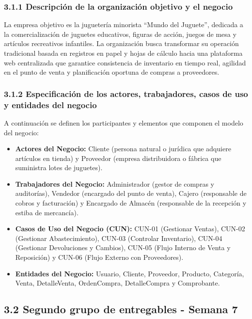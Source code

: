 \documentclass[12pt,a4paper]{article}
\begin{document}
\subsubsection{3.1.1 Descripci\'on de la organizaci\'on objetivo y el negocio}

La empresa objetivo es la jugueter\'ia minorista ``Mundo del Juguete'', dedicada a la comercializaci\'on de juguetes educativos, figuras de acci\'on, juegos de mesa y art\'iculos recreativos infantiles. La organizaci\'on busca transformar su operaci\'on tradicional basada en registros en papel y hojas de c\'alculo hacia una plataforma web centralizada que garantice consistencia de inventario en tiempo real, agilidad en el punto de venta y planificaci\'on oportuna de compras a proveedores.

\subsubsection{3.1.2 Especificaci\'on de los actores, trabajadores, casos de uso y entidades del negocio}

A continuaci\'on se definen los participantes y elementos que componen el modelo del negocio:
\begin{itemize}
  \item \textbf{Actores del Negocio:} Cliente (persona natural o jur\'idica que adquiere art\'iculos en tienda) y Proveedor (empresa distribuidora o f\'abrica que suministra lotes de juguetes).
  \item \textbf{Trabajadores del Negocio:} Administrador (gestor de compras y auditor\'ias), Vendedor (encargado del punto de venta), Cajero (responsable de cobros y facturaci\'on) y Encargado de Almac\'en (responsable de la recepci\'on y estiba de mercanc\'ia).
  \item \textbf{Casos de Uso del Negocio (CUN):} CUN-01 (Gestionar Ventas), CUN-02 (Gestionar Abastecimiento), CUN-03 (Controlar Inventario), CUN-04 (Gestionar Devoluciones y Cambios), CUN-05 (Flujo Interno de Venta y Reposici\'on) y CUN-06 (Flujo Externo con Proveedores).
  \item \textbf{Entidades del Negocio:} Usuario, Cliente, Proveedor, Producto, Categor\'ia, Venta, DetalleVenta, OrdenCompra, DetalleCompra y Comprobante.
\end{itemize}

\subsection{3.2 Segundo grupo de entregables - Semana 7}
\end{document}
